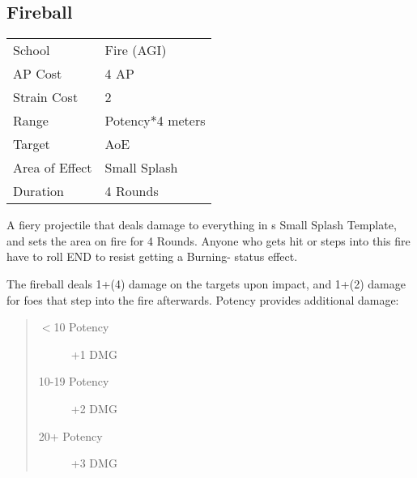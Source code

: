 \documentclass[11pt,a4paper,twocolumn]{book}
\begin{document}
\subsection*{Fireball}
{
	\begin{tabu} to 70mm{| X[l,4] | X[l,7] |}
		\hline
		School         & Fire (AGI)       \\
		AP Cost        & 4 AP             \\
		Strain Cost    & 2                \\
		Range          & Potency*4 meters \\
		Target         & AoE              \\
		Area of Effect & Small Splash     \\
		Duration       & 4 Rounds         \\ \hline
	\end{tabu}
	
}

\medskip

A fiery projectile that deals damage to everything in s Small Splash Template, and sets the area on fire for 4 Rounds. Anyone who gets hit or steps into this fire have to roll END to resist getting a Burning- status effect.

The fireball deals 1+(4) damage on the targets upon impact, and 1+(2) damage for foes that step into the fire afterwards. Potency provides additional damage: 

\begin{quote}
	\begin{description}
		\item[$<$10 Potency] 	+1 DMG
		\item[10-19 Potency] 	+2 DMG
		\item[20+ Potency]  	+3 DMG
	\end{description}	
\end{quote}
\end{document}
